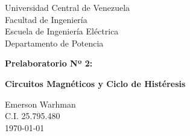 \begin{titlepage}
    \centering
    \Large
    Universidad Central de Venezuela\\
    Facultad de Ingeniería\\
    Escuela de Ingeniería Eléctrica\\
    Departamento de Potencia
    \vspace*{8cm}

    \Huge
    \textbf{Prelaboratorio Nº 2:}

    \textbf{Circuitos Magnéticos y Ciclo de Histéresis}
    \vfill


    \Large

    Emerson Warhman \\
    C.I. 25.795.480 \\
    \today

\end{titlepage}
